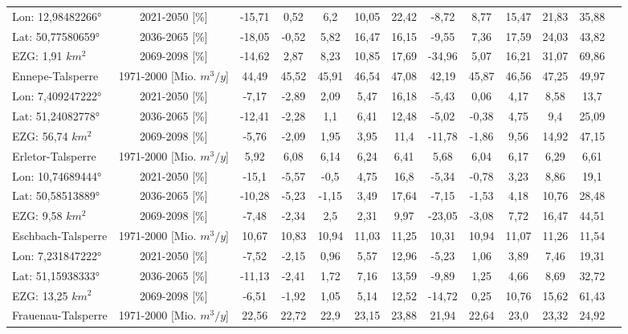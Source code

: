 \begin{longtable}{@{\extracolsep{\fill}}lc|ccccc||cccccc}
\cline{2-13} 
Lon: 12,98482266° & 2021-2050 [\%]  & -15,71 & 0,52 & 6,2 & 10,05 & 22,42 & -8,72 & 8,77 & 15,47 & 21,83 & 35,88 & \\ 
Lat: 50,77580659° & 2036-2065 [\%]  & -18,05 & -0,52 & 5,82 & 16,47 & 16,15 & -9,55 & 7,36 & 17,59 & 24,03 & 43,82 & \\ 
EZG: 1,91 $km^2$ & 2069-2098 [\%]  & -14,62 & 2,87 & 8,23 & 10,85 & 17,69 & -34,96 & 5,07 & 16,21 & 31,07 & 69,86 & \\ 
\hline 
Ennepe-Talsperre & 1971-2000 [Mio. $m^3/y$]  & 44,49 & 45,52 & 45,91 & 46,54 & 47,08 & 42,19 & 45,87 & 46,56 & 47,25 & 49,97 & \\ 
\cline{2-13} 
Lon: 7,409247222° & 2021-2050 [\%]  & -7,17 & -2,89 & 2,09 & 5,47 & 16,18 & -5,43 & 0,06 & 4,17 & 8,58 & 13,7 & \\ 
Lat: 51,24082778° & 2036-2065 [\%]  & -12,41 & -2,28 & 1,1 & 6,41 & 12,48 & -5,02 & -0,38 & 4,75 & 9,4 & 25,09 & \\ 
EZG: 56,74 $km^2$ & 2069-2098 [\%]  & -5,76 & -2,09 & 1,95 & 3,95 & 11,4 & -11,78 & -1,86 & 9,56 & 14,92 & 47,15 & \\ 
\hline 
Erletor-Talsperre & 1971-2000 [Mio. $m^3/y$]  & 5,92 & 6,08 & 6,14 & 6,24 & 6,41 & 5,68 & 6,04 & 6,17 & 6,29 & 6,61 & \\ 
\cline{2-13} 
Lon: 10,74689444° & 2021-2050 [\%]  & -15,1 & -5,57 & -0,5 & 4,75 & 16,8 & -5,34 & -0,78 & 3,23 & 8,86 & 19,1 & \\ 
Lat: 50,58513889° & 2036-2065 [\%]  & -10,28 & -5,23 & -1,15 & 3,49 & 17,64 & -7,15 & -1,53 & 4,18 & 10,76 & 28,48 & \\ 
EZG: 9,58 $km^2$ & 2069-2098 [\%]  & -7,48 & -2,34 & 2,5 & 2,31 & 9,97 & -23,05 & -3,08 & 7,72 & 16,47 & 44,51 & \\ 
\hline 
Eschbach-Talsperre & 1971-2000 [Mio. $m^3/y$]  & 10,67 & 10,83 & 10,94 & 11,03 & 11,25 & 10,31 & 10,94 & 11,07 & 11,26 & 11,54 & \\ 
\cline{2-13} 
Lon: 7,231847222° & 2021-2050 [\%]  & -7,52 & -2,15 & 0,96 & 5,57 & 12,96 & -5,23 & 1,06 & 3,89 & 7,46 & 19,31 & \\ 
Lat: 51,15938333° & 2036-2065 [\%]  & -11,13 & -2,41 & 1,72 & 7,16 & 13,59 & -9,89 & 1,25 & 4,66 & 8,69 & 32,72 & \\ 
EZG: 13,25 $km^2$ & 2069-2098 [\%]  & -6,51 & -1,92 & 1,05 & 5,14 & 12,52 & -14,72 & 0,25 & 10,76 & 15,62 & 61,43 & \\ 
\hline 
Frauenau-Talsperre & 1971-2000 [Mio. $m^3/y$]  & 22,56 & 22,72 & 22,9 & 23,15 & 23,88 & 21,94 & 22,64 & 23,0 & 23,32 & 24,92 & \\ 

\end{longtable}
